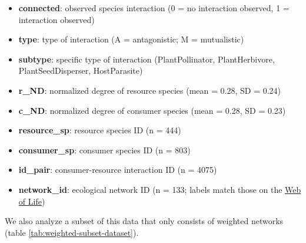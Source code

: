 \documentclass[11pt,]{article}
\providecommand{\tightlist}{%
  \setlength{\itemsep}{0pt}\setlength{\parskip}{0pt}}
\begin{document}
\begin{itemize}
\tightlist
\item
  \textbf{connected}: observed species interaction (0 = no interaction
  observed, 1 = interaction observed)
\item
  \textbf{type}: type of interaction (A = antagonistic; M = mutualistic)
\item
  \textbf{subtype}: specific type of interaction (PlantPollinator,
  PlantHerbivore, PlantSeedDisperser, HostParasite)
\item
  \textbf{r\_ND}: normalized degree of resource species (mean = 0.28, SD
  = 0.24)
\item
  \textbf{c\_ND}: normalized degree of consumer species (mean = 0.28, SD
  = 0.23)
\item
  \textbf{resource\_sp}: resource species ID (n = 444)
\item
  \textbf{consumer\_sp}: consumer species ID (n = 803)
\item
  \textbf{id\_pair}: consumer-resource interaction ID (n = 4075)
\item
  \textbf{network\_id}: ecological network ID (n = 133; labels match
  those on the \href{http://www.web-of-life.es/}{Web of Life})
\end{itemize}

We also analyze a subset of this data that only consists of weighted
networks (table \ref{tab:weighted-subset-dataset}).
\end{document}
